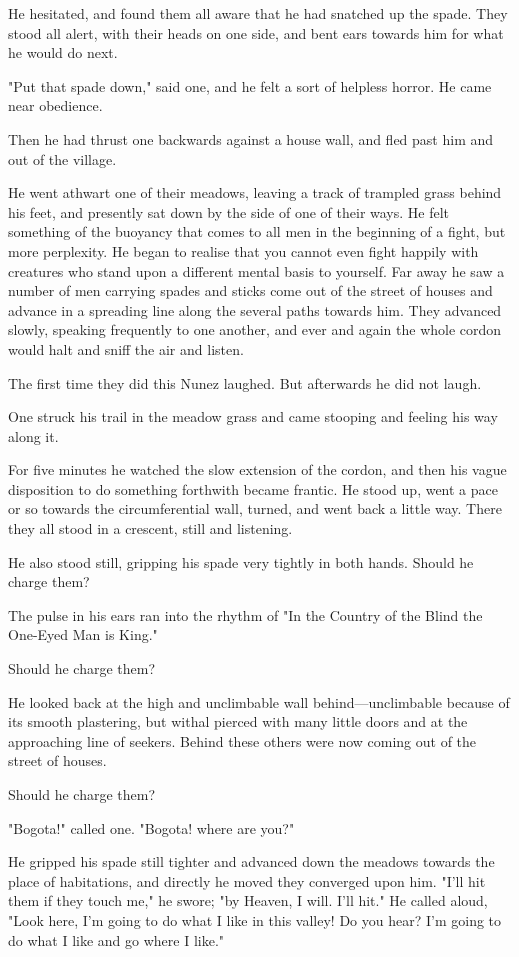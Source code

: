\documentclass[courier]{sffms}
\begin{document}
He hesitated, and found them all aware that he had snatched up the
spade. They stood all alert, with their heads on one side, and bent
ears towards him for what he would do next.

"Put that spade down," said one, and he felt a sort of helpless
horror. He came near obedience.

Then he had thrust one backwards against a house wall, and fled past
him and out of the village.

He went athwart one of their meadows, leaving a track of trampled
grass behind his feet, and presently sat down by the side of one of
their ways. He felt something of the buoyancy that comes to all men in
the beginning of a fight, but more perplexity. He began to realise
that you cannot even fight happily with creatures who stand upon a
different mental basis to yourself. Far away he saw a number of men
carrying spades and sticks come out of the street of houses and
advance in a spreading line along the several paths towards him. They
advanced slowly, speaking frequently to one another, and ever and
again the whole cordon would halt and sniff the air and listen.

The first time they did this Nunez laughed. But afterwards he did not
laugh.

One struck his trail in the meadow grass and came stooping and feeling
his way along it.

For five minutes he watched the slow extension of the cordon, and then
his vague disposition to do something forthwith became frantic. He
stood up, went a pace or so towards the circumferential wall, turned,
and went back a little way.  There they all stood in a crescent, still
and listening.

He also stood still, gripping his spade very tightly in both
hands. Should he charge them?

The pulse in his ears ran into the rhythm of "In the Country of the
Blind the One-Eyed Man is King."

Should he charge them?

He looked back at the high and unclimbable wall behind---unclimbable
because of its smooth plastering, but withal pierced with many little
doors and at the approaching line of seekers. Behind these others were
now coming out of the street of houses.

Should he charge them?

"Bogota!" called one. "Bogota! where are you?"

He gripped his spade still tighter and advanced down the meadows
towards the place of habitations, and directly he moved they converged
upon him. "I'll hit them if they touch me," he swore; "by Heaven, I
will. I'll hit." He called aloud, "Look here, I'm going to do what I
like in this valley! Do you hear? I'm going to do what I like and go
where I like."
\end{document}
